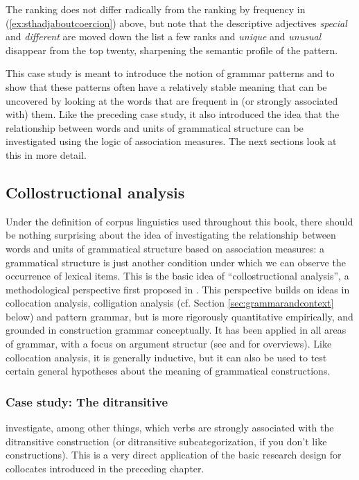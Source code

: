 The ranking does not differ radically from the ranking by frequency in (\ref{ex:sthadjaboutcoercion}) above, but note that the descriptive adjectives \textit{special} and \textit{different} are moved down the list a few ranks and \textit{unique} and \textit{unusual} disappear from the top twenty, sharpening the semantic profile of the pattern.

This case study is meant to introduce the notion of grammar patterns and to show that these patterns often have a relatively stable meaning that can be uncovered by looking at the words that are frequent in (or strongly associated with) them. Like the preceding case study, it also introduced the idea that the relationship between words and units of grammatical structure can be investigated using the logic of association measures. The next sections look at this in more detail.

\subsection{Collostructional analysis}
\label{sec:collostructionalanalysis}

Under the definition of corpus linguistics used throughout this book, there should be nothing surprising about the idea of investigating the relationship between words and units of grammatical structure based on association measures: a grammatical structure is just another condition under which we can observe the occurrence of lexical items. This is the basic idea of ``collostructional analysis'', a methodological perspective first proposed in \citet{stefanowitsch_collostructions:_2003}. This perspective builds on ideas in collocation analysis, colligation analysis (cf. Section \ref{sec:grammarandcontext} below) and pattern grammar, but is more rigorously quantitative empirically, and grounded in construction grammar conceptually. It has been applied in all areas of grammar, with a focus on argument structur (see \citet{ludeling_corpora_2009} and \citet{hoffmann_collostructional_2013} for overviews). Like collocation analysis, it is generally inductive, but it can also be used to test certain general hypotheses about the meaning of grammatical constructions.

\subsubsection{Case study: The ditransitive}
\label{sec:theditransitive}

\citet{stefanowitsch_collostructions:_2003} investigate, among other things, which verbs are strongly associated with the ditransitive construction (or ditransitive subcategorization, if you don't like constructions). This is a very direct application of the basic research design for collocates introduced in the preceding chapter.

